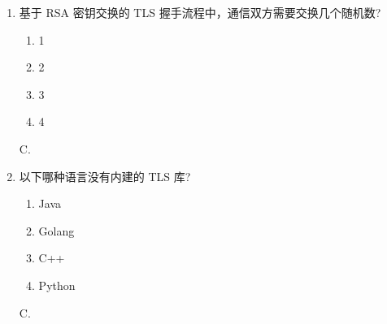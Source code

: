 \documentclass[degree=project,degree-type=project,cjk-font=noto]{thuthesis}
\begin{document}
\begin{enumerate}
  {\heiti 解：}

D.

\item 基于 RSA 密钥交换的 TLS 握手流程中，通信双方需要交换几个随机数?
\begin{enumerate}
  \item 1
  \item 2
  \item 3
  \item 4
\end{enumerate}

C.

\item 以下哪种语言没有内建的 TLS 库?
\begin{enumerate}
  \item Java
  \item Golang
  \item C++
  \item Python
\end{enumerate}

C.

\end{enumerate}
\end{document}
